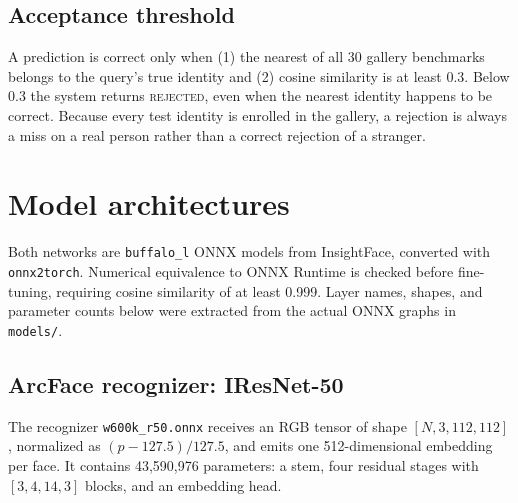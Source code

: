 \documentclass[11pt,a4paper]{article}
\newcommand{\code}[1]{\texttt{#1}}
\begin{document}
\subsection{Acceptance threshold}

A prediction is correct only when (1) the nearest of all 30 gallery benchmarks belongs to the query's true identity and (2) cosine similarity is at least 0.3. Below 0.3 the system returns \textsc{rejected}, even when the nearest identity happens to be correct. Because every test identity is enrolled in the gallery, a rejection is always a miss on a real person rather than a correct rejection of a stranger.

\section{Model architectures}

Both networks are \code{buffalo\_l} ONNX models from InsightFace, converted with \code{onnx2torch}. Numerical equivalence to ONNX Runtime is checked before fine-tuning, requiring cosine similarity of at least 0.999. Layer names, shapes, and parameter counts below were extracted from the actual ONNX graphs in \code{models/}.

\subsection{ArcFace recognizer: IResNet-50}

The recognizer \code{w600k\_r50.onnx} receives an RGB tensor of shape $[N,3,112,112]$, normalized as $(p-127.5)/127.5$, and emits one 512-dimensional embedding per face. It contains 43,590,976 parameters: a stem, four residual stages with $[3,4,14,3]$ blocks, and an embedding head.
\end{document}

